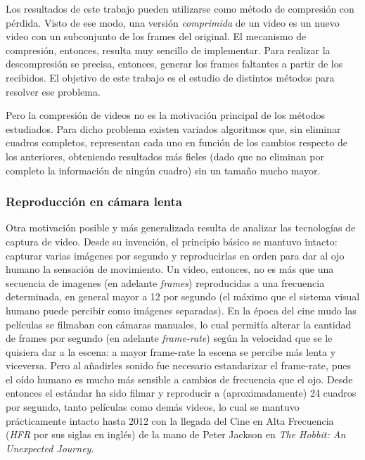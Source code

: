 Los resultados de este trabajo pueden utilizarse como método de compresión con pérdida. Visto de ese modo, una versión \emph{comprimida} de un video es un nuevo video con un subconjunto de los frames del original. El mecanismo de compresión, entonces, resulta muy sencillo de implementar. Para realizar la descompresión se precisa, entonces, generar los frames faltantes a partir de los recibidos. El objetivo de este trabajo es el estudio de distintos métodos para resolver ese problema.

Pero la compresión de videos no es la motivación principal de los métodos estudiados. Para dicho problema existen variados algoritmos que, sin eliminar cuadros completos, representan cada uno en función de los cambios respecto de los anteriores, obteniendo resultados más fieles (dado que no eliminan por completo la información de ningún cuadro) sin un tamaño mucho mayor\cite{wiki_data_compression_video}.

\subsubsection{Reproducción en cámara lenta}
Otra motivación posible y más generalizada resulta de analizar las tecnologías de captura de video. Desde su invención, el principio básico se mantuvo intacto: capturar varias imágenes por segundo y reproducirlas en orden para dar al ojo humano la sensación de movimiento. Un video, entonces, no es más que una secuencia de imagenes (en adelante \emph{frames}) reproducidas a una frecuencia determinada, en general mayor a 12 por segundo (el máximo que el sistema visual humano puede percibir como imágenes separadas\cite{wiki_framerate}). En la época del cine mudo las películas se filmaban con cámaras manuales, lo cual permitía alterar la cantidad de frames por segundo (en adelante \emph{frame-rate}) según la velocidad que se le quisiera dar a la escena: a mayor frame-rate la escena se percibe más lenta y viceversa. Pero al añadirles sonido fue necesario estandarizar el frame-rate, pues el oído humano es mucho más sensible a cambios de frecuencia que el ojo\cite{wiki_framerate}. Desde entonces el estándar ha sido 
filmar y reproducir a (aproximadamente) 24 cuadros por segundo, tanto películas como demás videos, lo cual se mantuvo prácticamente intacto hasta 2012 con la llegada del Cine en Alta Frecuencia (\emph{HFR} por sus siglas en inglés) de la mano de Peter Jackson en \emph{The Hobbit: An Unexpected Journey}.

